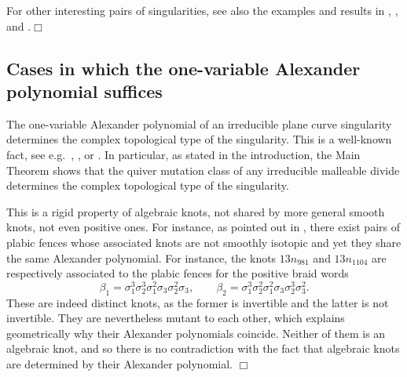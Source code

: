 \begin{remark}
For other interesting pairs of singularities, see also the examples and results in \cite{MichelWeber1986}, \cite[Section 4]{Yamamoto1984}, \cite[Example 3.2]{yoshinaga1979topological} and \cite{dubois2003seifert}.\hfill$\Box$
\end{remark}

\subsection{Cases in which the one-variable Alexander polynomial suffices}\label{ssec:one_variable_Alexander_suffices}

The one-variable Alexander polynomial of an irreducible plane curve singularity determines the complex topological type of the singularity. This is a well-known fact, see e.g.~\cite[Section 5]{Burau1932}, \cite[Lemma 2.5.1]{Le1972}, \cite{Yamamoto1984} or \cite[Section 1]{CDGZ}. In particular, as stated in the introduction, the Main Theorem shows that the quiver mutation class of any irreducible malleable divide determines the complex topological type of the singularity.

\begin{remark} This is a rigid property of algebraic knots, not shared by more general smooth knots, not even positive ones. For instance, as pointed out in \cite[Section 7]{Kalman2006}, there exist pairs of plabic fences whose associated knots are not smoothly isotopic and yet they share the same Alexander polynomial. For instance, the knots $13n_{981}$ and $13n_{1104}$ are respectively associated to the plabic fences for the positive braid words
$$\beta_1=\sigma_1^3\sigma_2^3\sigma_1^2\sigma_3\sigma_2^2\sigma_3,\qquad \beta_2=\sigma_1^3\sigma_2^2\sigma_1^2\sigma_3\sigma_2^3\sigma_3^2.$$
These are indeed distinct knots, as the former is invertible and the latter is not invertible. They are nevertheless mutant to each other, which explains geometrically why their Alexander polynomials coincide. Neither of them is an algebraic knot, and so there is no contradiction with the fact that algebraic knots are determined by their Alexander polynomial. \hfill$\Box$
\end{remark}

